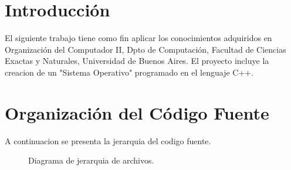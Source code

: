 \documentclass[a4paper,10pt]{article}
\begin{document}
\newpage
\tableofcontents
\newpage



\section*{Introducci\'on}
El siguiente trabajo tiene como fin aplicar los conocimientos adquiridos en Organización del Computador II, Dpto de Computación, Facultad de Ciencias Exactas y Naturales, Universidad de Buenos Aires.	El proyecto incluye la creacion de un "Sistema Operativo" programado en el lenguaje C++.



\section*{Organizaci\'on del C\'odigo Fuente}
A continuacion se presenta la jerarquia del codigo fuente.

\begin{figure}[H]
\centering
{}
\caption{Diagrama de jerarquia de archivos.}
\end{figure}
\end{document}
